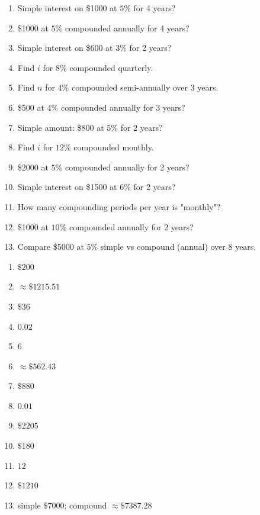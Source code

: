 \documentclass[11pt]{article}
\begin{document}
\begin{recapbox}
\begin{multicols}{2}
\small
\begin{enumerate}[leftmargin=*,itemsep=3pt]
  \item Simple interest on \$1000 at $5\%$ for 4 years?
  \item \$1000 at $5\%$ compounded annually for 4 years?
  \item Simple interest on \$600 at $3\%$ for 2 years?
  \item Find $i$ for $8\%$ compounded quarterly.
  \item Find $n$ for $4\%$ compounded semi-annually over 3 years.
  \item \$500 at $4\%$ compounded annually for 3 years?
  \item Simple amount: \$800 at $5\%$ for 2 years?
  \item Find $i$ for $12\%$ compounded monthly.
  \item \$2000 at $5\%$ compounded annually for 2 years?
  \item Simple interest on \$1500 at $6\%$ for 2 years?
  \item How many compounding periods per year is "monthly"?
  \item \$1000 at $10\%$ compounded annually for 2 years?
  \item Compare \$5000 at $5\%$ simple vs compound (annual) over 8 years.
\end{enumerate}
\end{multicols}
\end{recapbox}

\begin{keybox}
\begin{multicols}{2}
\small
\begin{enumerate}[leftmargin=*,itemsep=3pt]
  \item $\$200$
  \item $\approx\$1215.51$
  \item $\$36$
  \item $0.02$
  \item $6$
  \item $\approx\$562.43$
  \item $\$880$
  \item $0.01$
  \item $\$2205$
  \item $\$180$
  \item $12$
  \item $\$1210$
  \item simple $\$7000$; compound $\approx\$7387.28$
\end{enumerate}
\end{multicols}
\end{keybox}
\end{document}
